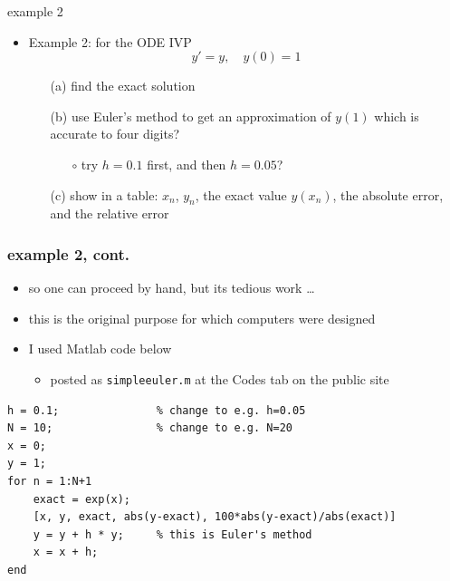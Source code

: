 \documentclass[colorlinks]{beamer}
\begin{document}
\begin{frame}{example 2}

\begin{itemize}
\item Example 2:  for the ODE IVP
    $$y'=y, \quad y(0)=1$$

    \begin{itemize}
    \item[(a)] find the exact solution
    \item[(b)] use Euler's method to get an approximation of $y(1)$ which is accurate to four digits?
        \begin{itemize}
        \item[$\circ$] try $h=0.1$ first, and then $h=0.05$?
        \end{itemize}
    \item[(c)] show in a table: $x_n$, $y_n$, the exact value $y(x_n)$, the absolute error, and the relative error
    \end{itemize}
\end{itemize}

\vspace{40mm}
\end{frame}


\begin{frame}[fragile]
\frametitle{example 2, cont.}

\begin{itemize}
\item so one can proceed by hand, but its tedious work \dots
\item \alert{this is the original purpose for which computers were designed}
\item I used Matlab code below
    \begin{itemize}
    \item posted as \texttt{simpleeuler.m} at the Codes tab on the public site
    \end{itemize}
\end{itemize}

\medskip
{\footnotesize
\begin{Verbatim}
h = 0.1;               % change to e.g. h=0.05
N = 10;                % change to e.g. N=20
x = 0;
y = 1;
for n = 1:N+1
    exact = exp(x);
    [x, y, exact, abs(y-exact), 100*abs(y-exact)/abs(exact)]
    y = y + h * y;     % this is Euler's method
    x = x + h;
end
\end{Verbatim}
}
\end{frame}
\end{document}
